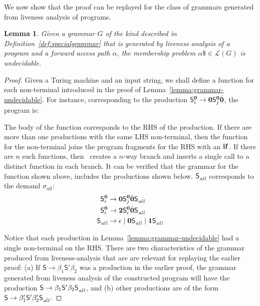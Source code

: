 \documentclass[preprint, 9pt]{sigplanconf}
\newtheorem{lemma}[theorem]{Lemma}
\begin{document}
We now show that the proof can be replayed for the class of grammars
generated from liveness analysis of programs. 

\begin{lemma}\label{lemma:grammar-from-analysis-undecidable}
Given   a    grammar    $G$    of   the    kind    described    in
Definition~\ref{def:specialgrammar}  that  is  generated  by  liveness
analysis  of a  program  and  a forward  access  path $\alpha$,    the
membership problem $\alpha\$ \in \mathscr{L}(G)$ is undecidable.
\end{lemma} 

\begin{proof}
Given a Turing machine and an input string, we shall define a function
for   each  non-terminal   introduced  in   the  proof   of
Lemma~\ref{lemma:grammar-undecidable}.
For instance, corresponding to the production $\mathsf{S}_{i}^{\mathbf{0}} \rightarrow
\mathbf{0} \mathsf{S}_{j}^{\mathbf{0}}\bar{\mathbf{0}}$,
the program is:
 


The body of the function corresponds  to the RHS of the production. If
there are  more than one  productions with the same  LHS non-terminal,
then the function for the non-terminal joins the program fragments for
the  RHS  with an  $\mbox{$\mathbf{ if}$}$.   If  there  are  $n$ such  functions,  then
\mainpgm\ creates  a $n$-way  branch and  inserts a  single call  to a
distinct function in each branch. It  can be verified that the grammar
for      the     function      shown      above,     includes      the
productions shown below. $\mathsf{S}_{\mathit{all}}^{}$   corresponds   to  the   demand
$\sigma_{\mathit{all}}$:
\begin{align*}
\mathsf{S}_{i}^{\mathbf{0}} &\rightarrow \mathbf{0}\mathsf{S}_{j}^{\mathbf{0}}\bar{\mathbf{0}}\mathsf{S}_{\mathit{all}}^{} \\
\mathsf{S}_{i}^{\mathbf{0}} &\rightarrow {\mathbf{2}}\mathsf{S}_{i}^{\mathbf{0}}\bar{\mathbf{0}}\mathsf{S}_{\mathit{all}}^{} \\
\mathsf{S}_{\mathit{all}}^{} &\rightarrow \epsilon \mid \mathbf{0}\mathsf{S}_{\mathit{all}}^{} \mid
\mathbf{1}\mathsf{S}_{\mathit{all}}^{}
\end{align*}



Notice that  each production  in Lemma~\ref{lemma:grammar-undecidable}
had a single non-terminal on the RHS. There are two characteristics of
the grammar produced from liveness-analysis  that are are relevant for
replaying the  earlier proof:  (a) If $\mathsf{S}  \rightarrow \beta_1
\mathsf{S'}  \beta_2$  was a  production  in  the earlier  proof,  the
grammar  generated from  liveness  analysis of the constructed program
will  have the  production
$\mathsf{S}      \rightarrow      \beta_1     \mathsf{S'}      \beta_2
\mathsf{S}_{\mathit{\mathit{all}}}^{}$,  and (b)  other  productions are  of the  form
$\mathsf{S}       \rightarrow       \beta_1'\mathsf{S'}       \beta_2'
\mathsf{S}_{\mathit{all}}^{}$.


\end{proof}
\end{document}
